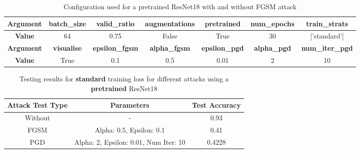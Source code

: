 \documentclass{article}
\begin{document}
\begin{table}[h!]
    \centering
    \begin{tabular}{|c|c|c|c|c|c|c|}
    \hline
    \textbf{Argument} & \textbf{batch\_size} & \textbf{valid\_ratio} & \textbf{augmentations} & \textbf{pretrained} & \textbf{num\_epochs} & \textbf{train\_strats} \\
    \hline
    \textbf{Value} & 64 & 0.75 & False & True & 30 & ['standard'] \\
    \hline
    \textbf{Argument} & \textbf{visualise} & \textbf{epsilon\_fgsm} & \textbf{alpha\_fgsm} & \textbf{epsilon\_pgd} & \textbf{alpha\_pgd} & \textbf{num\_iter\_pgd} \\
    \hline
    \textbf{Value} & True & 0.1 & 0.5 & 0.01 & 2 & 10 \\
    \hline
    \end{tabular}
    \caption{Configuration used for a pretrained ResNet18 with and without FGSM attack}
\end{table}

\begin{table}[h!]
    \centering
    \begin{tabular}{|c|c|c|}
    \hline
    \textbf{Attack Test Type} & \textbf{Parameters} & \textbf{Test Accuracy} \\
    \hline
    Without & - & 0.93 \\
    \hline
    FGSM & Alpha: 0.5, Epsilon: 0.1 & 0.41 \\
    \hline
    PGD & Alpha: 2, Epsilon: 0.01, Num Iter: 10 & 0.4228 \\
    \hline
    \end{tabular}
    \caption{Testing results for \textbf{standard} training loss for different attacks using a \textbf{pretrained} ResNet18}
\end{table}
\end{document}
